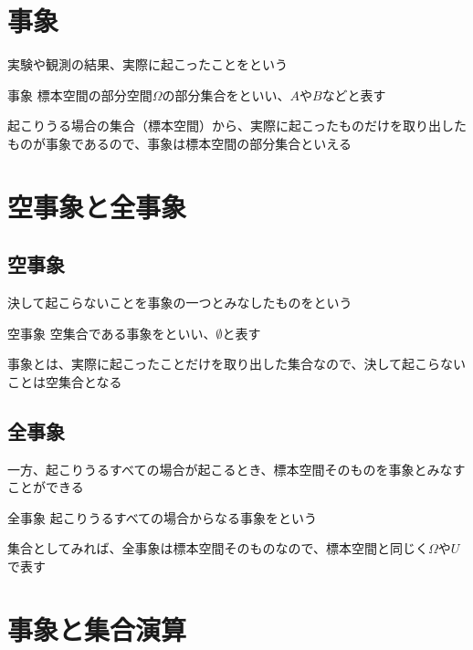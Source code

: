 \documentclass[../../../topic_probability-statistics]{subfiles}
\begin{document}
\sectionline
\section{事象}

実験や観測の結果、実際に起こったことをという

\begin{definition}{事象}
  標本空間の部分空間$\Omega$の部分集合をといい、$A$や$B$などと表す
\end{definition}

起こりうる場合の集合（標本空間）から、実際に起こったものだけを取り出したものが事象であるので、事象は標本空間の部分集合といえる

\sectionline
\section{空事象と全事象}

\subsection{空事象}

決して起こらないことを事象の一つとみなしたものをという

\begin{definition}{空事象}
  空集合である事象をといい、$\emptyset$と表す
\end{definition}

事象とは、実際に起こったことだけを取り出した集合なので、決して起こらないことは空集合となる

\subsection{全事象}

一方、起こりうるすべての場合が起こるとき、標本空間そのものを事象とみなすことができる

\begin{definition}{全事象}
  起こりうるすべての場合からなる事象をという

  集合としてみれば、全事象は標本空間そのものなので、標本空間と同じく$\Omega$や$U$で表す
\end{definition}

\sectionline
\section{事象と集合演算}
\end{document}
